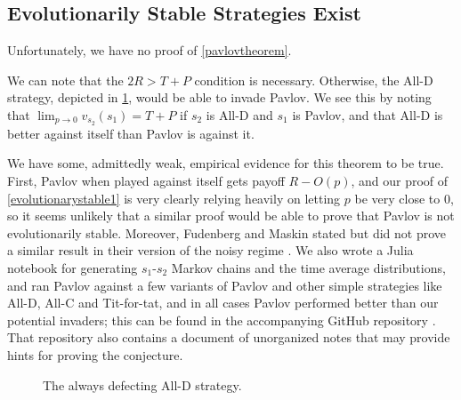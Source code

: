 \documentclass[11pt]{amsart}
\theoremstyle{definition}
\theoremstyle{remark}
\begin{document}



    \subsection{Evolutionarily Stable Strategies Exist}

    Unfortunately, we have no proof of \cref{pavlovtheorem}.

    We can note that the $2R > T + P$ condition is necessary. Otherwise, the All-D strategy, depicted in \cref{figurealld}, would be able to invade Pavlov. We see this by noting that $\lim_{p \to 0} v_{s_2}(s_1) = T + P$ if $s_2$ is All-D and $s_1$ is Pavlov, and that All-D is better against itself than Pavlov is against it.

    We have some, admittedly weak, empirical evidence for this theorem to be true. First, Pavlov when played against itself gets payoff $R - O(p)$, and our proof of \cref{evolutionarystable1} is very clearly relying heavily on letting $p$ be very close to 0, so it seems unlikely that a similar proof would be able to prove that Pavlov is not evolutionarily stable. Moreover, Fudenberg and Maskin stated but did not prove a similar result in their version of the noisy regime \cite{fundenberg1990evolution}. We also wrote a Julia notebook for generating $s_1$-$s_2$ Markov chains and the time average distributions, and ran Pavlov against a few variants of Pavlov and other simple strategies like All-D, All-C and Tit-for-tat, and in all cases Pavlov performed better than our potential invaders; this can be found in the accompanying GitHub repository \cite{arvid2020}. That repository also contains a document of unorganized notes that may provide hints for proving the conjecture.

\begin{figure}
  \centering
  \caption{The always defecting All-D strategy.}
  \label{figurealld}
\end{figure}
\end{document}
